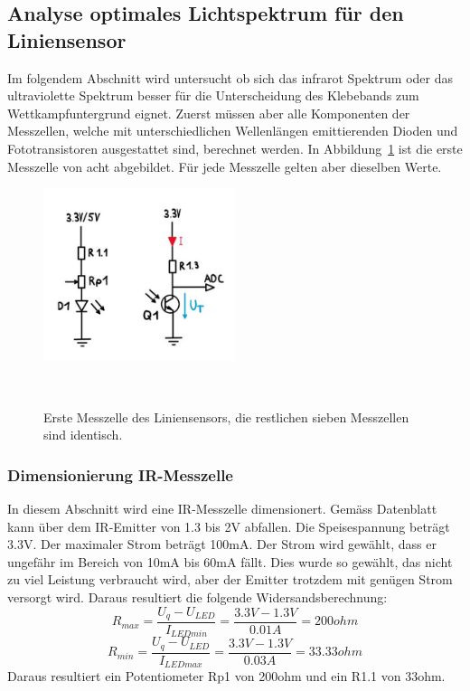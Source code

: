 \documentclass[main.tex]{subfiles} %
\begin{document}
\subsection{Analyse optimales Lichtspektrum für den Liniensensor}

Im folgendem Abschnitt wird untersucht ob sich das infrarot Spektrum oder das ultraviolette Spektrum besser für
die Unterscheidung des Klebebands zum Wettkampfuntergrund eignet. Zuerst müssen aber alle Komponenten der Messzellen, 
welche mit unterschiedlichen Wellenlängen emittierenden Dioden und Fototransistoren ausgestattet sind, berechnet werden.
In Abbildung~\ref{fig:Schema_Messzelle_Liniensensor} ist die erste Messzelle von acht abgebildet. Für jede Messzelle
gelten aber dieselben Werte.

\begin{figure}[h!]
    \centering
    \includegraphics[width=0.5\textwidth]{./fig_Liniensensor/Schema_Messzelle_Liniensensor}
    \caption{Erste Messzelle des Liniensensors, die restlichen sieben Messzellen sind identisch.}~\label{fig:Schema_Messzelle_Liniensensor}
\end{figure}


\subsubsection{Dimensionierung IR-Messzelle}
In diesem Abschnitt wird eine IR-Messzelle dimensionert. Gemäss Datenblatt kann über dem IR-Emitter von 1.3 bis 2V
abfallen. Die Speisespannung beträgt 3.3V. Der maximaler Strom beträgt 100mA. Der Strom wird gewählt, dass er ungefähr im 
Bereich von 10mA bis 60mA fällt. Dies wurde so gewählt, das nicht zu viel Leistung verbraucht wird, aber der Emitter trotzdem 
mit genügen Strom versorgt wird. Daraus resultiert die folgende Widersandsberechnung:
\[
    R_{max} = \frac{U_q - U_{LED}}{I_{LEDmin}} = \frac{3.3V - 1.3V}{0.01A} = 200ohm
\]
\[
    R_{min} = \frac{U_q - U_{LED}}{I_{LEDmax}} = \frac{3.3V - 1.3V}{0.03A} = 33.33ohm
\]
Daraus resultiert ein Potentiometer Rp1 von 200ohm und ein R1.1 von 33ohm.
\end{document}
